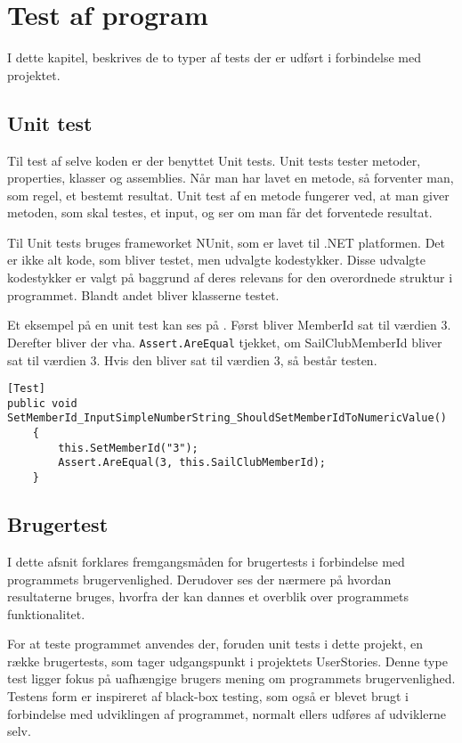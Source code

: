 \chapter{Test af program}\label{test_af_program}
I dette kapitel, beskrives de to typer af tests der er udført i forbindelse med projektet.

\section{Unit test}
Til test af selve koden er der benyttet Unit tests.
Unit tests tester metoder, properties, klasser og assemblies. 
Når man har lavet en metode, så forventer man, som regel, et bestemt resultat.
Unit test af en metode fungerer ved, at man giver metoden, som skal testes, et input, og ser om man får det forventede resultat.

Til Unit tests bruges frameworket NUnit, som er lavet til .NET platformen. 
Det er ikke alt kode, som bliver testet, men udvalgte kodestykker.
Disse udvalgte kodestykker er valgt på baggrund af deres relevans for den overordnede struktur i programmet. 
Blandt andet bliver klasserne testet.

Et eksempel på en unit test kan ses på .
Først bliver MemberId sat til værdien 3. 
Derefter bliver der vha. \texttt{Assert.AreEqual} tjekket, om SailClubMemberId bliver sat til værdien 3.
Hvis den bliver sat til værdien 3, så består testen.

\begin{lstlisting}[frame=single, caption=Eksempel på Unit test, label=unit_test]
[Test]
public void SetMemberId_InputSimpleNumberString_ShouldSetMemberIdToNumericValue()
	{
		this.SetMemberId("3");
		Assert.AreEqual(3, this.SailClubMemberId);
	}
\end{lstlisting}

\section{Brugertest}
I dette afsnit forklares fremgangsmåden for brugertests i forbindelse med programmets brugervenlighed.
Derudover ses der nærmere på hvordan resultaterne bruges, hvorfra der kan dannes et overblik over programmets funktionalitet. 

For at teste programmet anvendes der, foruden unit tests i dette projekt, en række brugertests, som tager udgangspunkt i projektets UserStories.
Denne type test ligger fokus på uafhængige brugers mening om programmets brugervenlighed.
Testens form er inspireret af black-box testing, som også er blevet brugt i forbindelse med udviklingen af programmet, normalt ellers udføres af udviklerne selv.

